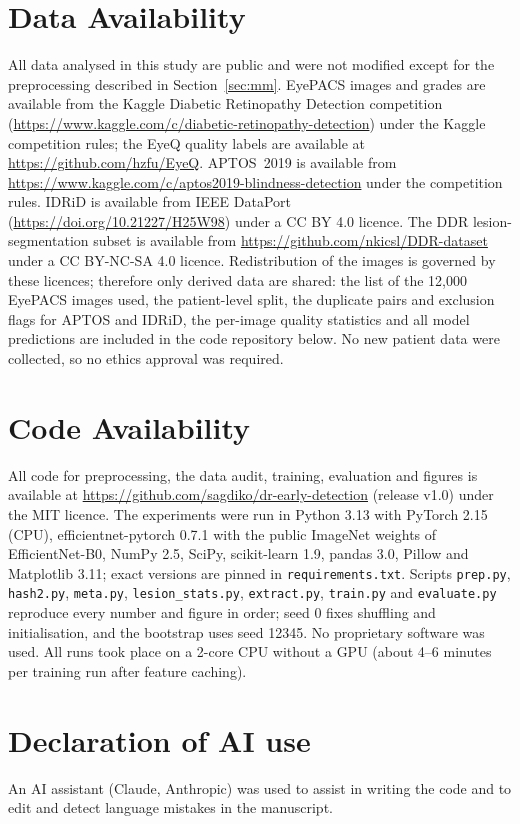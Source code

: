 \section*{Data Availability}
All data analysed in this study are public and were not modified except for the preprocessing described in Section~\ref{sec:mm}. EyePACS images and grades are available from the Kaggle Diabetic Retinopathy Detection competition (\url{https://www.kaggle.com/c/diabetic-retinopathy-detection}) under the Kaggle competition rules; the EyeQ quality labels are available at \url{https://github.com/hzfu/EyeQ}. APTOS~2019 is available from \url{https://www.kaggle.com/c/aptos2019-blindness-detection} under the competition rules. IDRiD is available from IEEE DataPort (\url{https://doi.org/10.21227/H25W98}) under a CC BY 4.0 licence. The DDR lesion-segmentation subset is available from \url{https://github.com/nkicsl/DDR-dataset} under a CC BY-NC-SA 4.0 licence. Redistribution of the images is governed by these licences; therefore only derived data are shared: the list of the 12{,}000 EyePACS images used, the patient-level split, the duplicate pairs and exclusion flags for APTOS and IDRiD, the per-image quality statistics and all model predictions are included in the code repository below. No new patient data were collected, so no ethics approval was required.

\section*{Code Availability}
All code for preprocessing, the data audit, training, evaluation and figures is available at \url{https://github.com/sagdiko/dr-early-detection} (release v1.0) under the MIT licence. The experiments were run in Python 3.13 with PyTorch 2.15 (CPU), efficientnet-pytorch 0.7.1 with the public ImageNet weights of EfficientNet-B0, NumPy 2.5, SciPy, scikit-learn 1.9, pandas 3.0, Pillow and Matplotlib 3.11; exact versions are pinned in \texttt{requirements.txt}. Scripts \texttt{prep.py}, \texttt{hash2.py}, \texttt{meta.py}, \texttt{lesion\_stats.py}, \texttt{extract.py}, \texttt{train.py} and \texttt{evaluate.py} reproduce every number and figure in order; seed 0 fixes shuffling and initialisation, and the bootstrap uses seed 12345. No proprietary software was used. All runs took place on a 2-core CPU without a GPU (about 4--6 minutes per training run after feature caching).

\section*{Declaration of AI use}
An AI assistant (Claude, Anthropic) was used to assist in writing the code and to edit and detect language mistakes in the manuscript.

